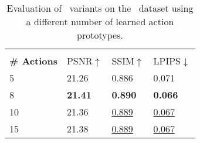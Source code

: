 

\begin{table}[h!]
	\centering
	\caption{
		 Evaluation of \Method~variants on the \RobotDB~dataset using a different number
		 of learned action prototypes.
	}
	\label{table: num_actions}
	\vspace{-0.3cm}
	\footnotesize
	\renewcommand{\arraystretch}{1.}
	\begin{tabular}{P{2.2cm} P{1.05cm}P{1.05cm}P{1.05cm}}
		\toprule
		 &   \\
		\cmidrule(r){2-4} 
		\textbf{\# Actions} & {PSNR}$\uparrow$ & {SSIM}$\uparrow$ & {LPIPS}$\downarrow$ \\
		\midrule
		5  & 21.26 & 0.886  & 0.071 \\
		8  & \textbf{21.41} & \textbf{0.890} & \textbf{0.066} \\
		10 & 21.36 & \underline{0.889} & \underline{0.067} \\
		15 & 21.38 & \underline{0.889} & \underline{0.067} \\
		\bottomrule
	\end{tabular}
\end{table}

